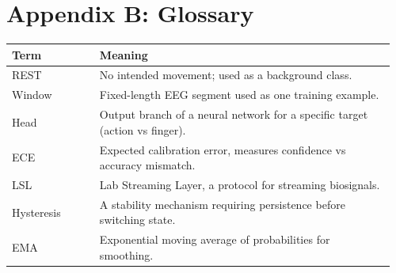 \documentclass[11pt]{article}
\begin{document}
\section{Appendix B: Glossary}
\begin{longtable}{p{0.22\linewidth} p{0.74\linewidth}}
\toprule
Term & Meaning \\
\midrule
REST & No intended movement; used as a background class.\\
Window & Fixed-length EEG segment used as one training example.\\
Head & Output branch of a neural network for a specific target (action vs finger).\\
ECE & Expected calibration error, measures confidence vs accuracy mismatch.\\
LSL & Lab Streaming Layer, a protocol for streaming biosignals.\\
Hysteresis & A stability mechanism requiring persistence before switching state.\\
EMA & Exponential moving average of probabilities for smoothing.\\
\bottomrule
\end{longtable}
\end{document}

